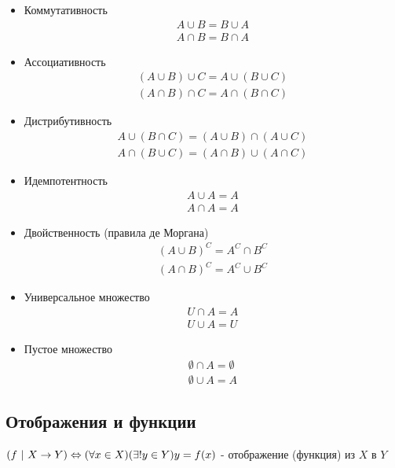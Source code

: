 \begin{itemize}
    \item Коммутативность
    \begin{align*}
        A \cup B = B \cup A \\
        A \cap B = B \cap A
    \end{align*}
    \item Ассоциативность
    \begin{align*}
        (A \cup B) \cup C = A \cup (B \cup C) \\
        (A \cap B) \cap C = A \cap (B \cap C)
    \end{align*}
    \item Дистрибутивность
    \begin{align*}
        A \cup (B \cap C) = (A \cup B) \cap (A \cup C) \\
        A \cap (B \cup C) = (A \cap B) \cup (A \cap C)
    \end{align*}
    \item Идемпотентность
    \begin{align*}
        A \cup A = A \\
        A \cap A = A
    \end{align*}
    \item Двойственность (правила де Моргана)
    \begin{align*}
        (A \cup B)^C = A^C \cap B^C \\
        (A \cap B)^C = A^C \cup B^C
    \end{align*}
    \item Универсальное множество
    \begin{align*}
        U \cap A = A \\
        U \cup A = U
    \end{align*}
    \item Пустое множество
    \begin{align*}
        \emptyset \cap A = \emptyset \\
        \emptyset \cup A = A
    \end{align*}
\end{itemize}


\subsection{Отображения и функции}

\begin{definition}
    $(f\ |\ X \rightarrow Y) \Leftrightarrow (\forall x \in X)(\exists! y \in Y) y = f(x)$ - отображение (функция) из $X$ в $Y$
\end{definition}

